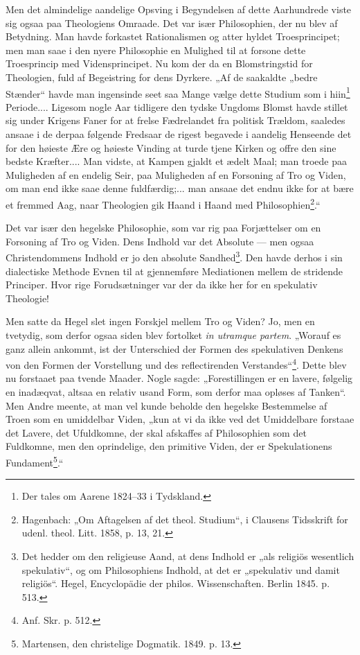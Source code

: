 \documentclass[12pt,a4paper]{book}
\newcommand{\opage}[1]{\marginnote{\footnotesize\textit{[#1]}}}
\begin{document}
Men det almindelige aandelige Opsving i Begyndelsen af dette Aarhundrede
viste sig ogsaa paa Theologiens Omraade. Det var især Philosophien, der nu
blev af Betydning. Man havde forkastet Rationalismen og atter hyldet
Troesprincipet; men man saae i den nyere Philosophie en Mulighed til at
forsone dette Troesprincip med Vidensprincipet. Nu kom der da en
Blomstringstid for Theologien, fuld af Begeistring for dens Dyrkere. „Af de
saakaldte „bedre Stænder“ havde man ingensinde seet saa Mange vælge dette
Studium som i hiin\footnote{Der tales om Aarene 1824--33 i Tydskland.}
Periode.... Ligesom nogle Aar tidligere den tydske Ungdoms Blomst havde
stillet sig under Krigens Faner for at frelse Fædrelandet fra politisk
Trældom, saaledes ansaae i de derpaa følgende Fredsaar de rigest begavede i
aandelig Henseende det for den høieste Ære og høieste Vinding at turde tjene
Kirken og offre den sine bedste Kræfter.... Man vidste, at Kampen gjaldt et
ædelt Maal; man troede paa Muligheden af en endelig Seir, paa Muligheden af
en Forsoning af Tro og
\opage{15}\setcounter{footnote}{0}%
Viden, om man end ikke saae denne fuldfærdig;... man ansaae det endnu ikke
for at bære et fremmed Aag, naar Theologien gik Haand i Haand med
Philosophien\footnote{Hagenbach: „Om Aftagelsen af det theol. Studium“, i
Clausens Tidsskrift for udenl. theol. Litt. 1858, p. 13, 21.}.“

Det var især den hegelske Philosophie, som var rig paa Forjættelser om en
Forsoning af Tro og Viden. Dens Indhold var det Absolute --- men ogsaa
Christendommens Indhold er jo den absolute Sandhed\footnote{Det hedder om
den religieuse Aand, at dens Indhold er „als religiös wesentlich
spekulativ“, og om Philosophiens Indhold, at det er „spekulativ und damit
religiös“. Hegel, Encyclopädie der philos. Wissenschaften. Berlin 1845.
p. 513.}. Den havde derhos i sin dialectiske Methode Evnen til at
gjennemføre Mediationen mellem de stridende Principer. Hvor rige
Forudsætninger var der da ikke her for en spekulativ Theologie!

Men satte da Hegel slet ingen Forskjel mellem Tro og Viden? Jo, men en
tvetydig, som derfor ogsaa siden blev fortolket \textit{in utramque partem}.
„Worauf es ganz allein ankommt, ist der Unterschied der Formen des
spekulativen Denkens von den Formen der Vorstellung und des reflectirenden
Verstandes“\footnote{Anf. Skr. p. 512.}. Dette blev nu forstaaet
paa tvende Maader. Nogle sagde: „Forestillingen er en lavere, følgelig en
inadæqvat, altsaa en relativ usand Form, som derfor maa opløses af
Tanken“. Men Andre meente, at man vel kunde beholde den hegelske
Bestemmelse af Troen som en umiddelbar Viden, „kun at vi da ikke ved det
Umiddelbare forstaae det Lavere, det Ufuldkomne, der skal afskaffes af
Philosophien som det Fuldkomne, men den oprindelige, den primitive Viden,
der er Spekulationens Fundament\footnote{Martensen, den christelige
Dogmatik. 1849. p. 13.}.“
\end{document}

